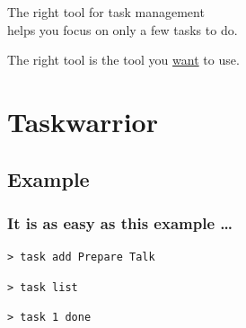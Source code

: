 \documentclass[t,handout,aspectratio=169]{beamer}
\begin{document}
\begin{frame}[standout]
    The right tool for task management \pause \\
    helps you focus on only a few tasks to do.
\end{frame}

\begin{frame}[standout]
    The right tool is the tool you \underline{want} to use.
\end{frame}

\section{Taskwarrior}

\subsection{Example}

\begin{frame}[fragile]\frametitle{It is as easy as this example \ldots}
    \vfill
    \begin{lstlisting}
> task add Prepare Talk\end{lstlisting} \pause

\begin{lstlisting}
> task list\end{lstlisting} \pause

\begin{lstlisting}
> task 1 done\end{lstlisting}
\end{frame}
\end{document}
